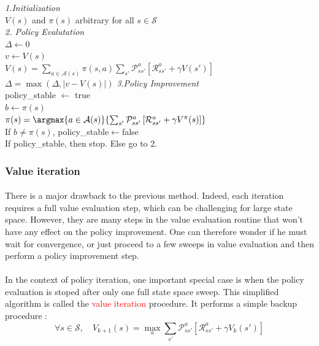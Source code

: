 \documentclass[a4paper]{article}
\begin{document}
{{			
			{
				\begin{algorithm}[H]
	 				\SetAlgoLined
					\LinesNumbered
					 \textsf{\emph{1.Initialization}} \\
					 	\indent $V(s)$ and $\pi(s)$ arbitrary for all $s\in\mathcal{S}$ \\
					 \BlankLine
					 \BlankLine
					 \textsf{\emph{2. Policy Evalutation}}\\
						{
							$\Delta \leftarrow 0$ \\
							{
									$v\leftarrow V(s)$ \\
									$V(s) = \sum_{a\in\mathcal{A}(s)} \pi(s,a) \sum_{s'} \mathcal{P}_{ss'}^a \left[ \mathcal{R}_{ss'}^a + \gamma V(s')\right] $ \\
									$ \Delta = \max{\left(\Delta, \vert v - V(s)\vert \right)}$
							}
						}
					\BlankLine
					\BlankLine
					\textsf{\emph{3.Policy Improvement}} \\
					policy\_stable $\leftarrow$ true\\
					{
						$b\leftarrow \pi(s)$\\
						$\pi(s) = \argmax{a\in\mathcal{A}(s)}{\sum_{s'}\mathcal{P}_{ss'}^a\left[\mathcal{R}_{ss'}^a + \gamma V^\pi(s)\right]}$\\
						If $b\neq \pi(s)$, policy\_stable$\leftarrow$false\\
					}
					If policy\_stable, then stop. Else go to 2. 
				\end{algorithm}
			}
			\subsubsection{Value iteration}
			{
				\paragraph{} There is a major drawback to the previous method. Indeed, each iteration requires a full value evaluation step, which can be challenging for large state space. However, they are many steps in the value evaluation routine that won't have any effect on the policy improvement. One can therefore wonder if he must wait for convergence, or just proceed to a few sweeps in value evaluation and then perform a policy improvement step. 
				
				\paragraph{} In the context of policy iteration, one important special case is when the policy evaluation is stoped after only one full state space sweep. This simplified algorithm is called the \textcolor{red}{value iteration} procedure. It performs a simple backup procedure : 
				\begin{equation}
					\forall{s}\in\mathcal{S}, \quad V_{k+1}(s) = \max_{a}\sum_{s'} \mathcal{P}_{ss'}^a\left[\mathcal{R}_{ss'}^a + \gamma V_k(s')\right]
				\end{equation}
				
}}}
\end{document}
